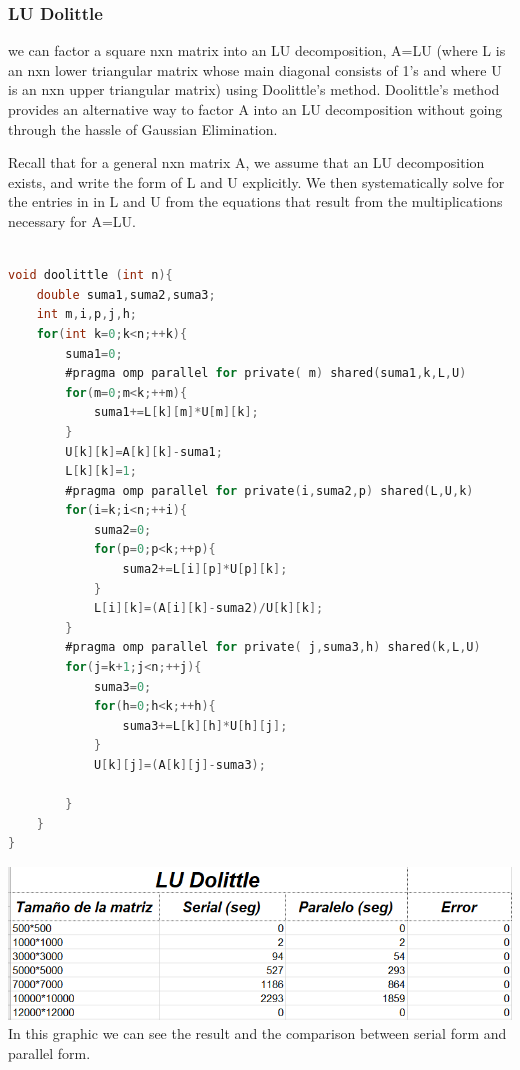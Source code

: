 \documentclass{article}
\newcounter{subsubsubsection}[subsubsection]
\begin{document}
\subsubsection{LU Dolittle}


we can factor a square nxn matrix into an LU decomposition, A=LU (where L is an nxn lower triangular matrix whose main diagonal consists of 1's and where U is an nxn upper triangular matrix) using Doolittle's method. Doolittle's method provides an alternative way to factor A into an LU decomposition without going through the hassle of Gaussian Elimination.

Recall that for a general nxn matrix A, we assume that an LU decomposition exists, and write the form of L and U explicitly. We then systematically solve for the entries in in L and U from the equations that result from the multiplications necessary for A=LU.


\begin{lstlisting}[language=C]

void doolittle (int n){
    double suma1,suma2,suma3;
    int m,i,p,j,h;
    for(int k=0;k<n;++k){
        suma1=0;
        #pragma omp parallel for private( m) shared(suma1,k,L,U)
        for(m=0;m<k;++m){
            suma1+=L[k][m]*U[m][k];
        }
        U[k][k]=A[k][k]-suma1;
        L[k][k]=1;
        #pragma omp parallel for private(i,suma2,p) shared(L,U,k)
        for(i=k;i<n;++i){
            suma2=0;
            for(p=0;p<k;++p){
                suma2+=L[i][p]*U[p][k];
            }
            L[i][k]=(A[i][k]-suma2)/U[k][k];
        }
        #pragma omp parallel for private( j,suma3,h) shared(k,L,U)
        for(j=k+1;j<n;++j){
            suma3=0;
            for(h=0;h<k;++h){
                suma3+=L[k][h]*U[h][j];
            }
            U[k][j]=(A[k][j]-suma3);
         
        }
    }
}

\end{lstlisting}





\includegraphics[width=\linewidth]{./images/dolittle.PNG}\\
In this graphic we can see the result and the comparison between serial form and parallel form.
\end{document}
